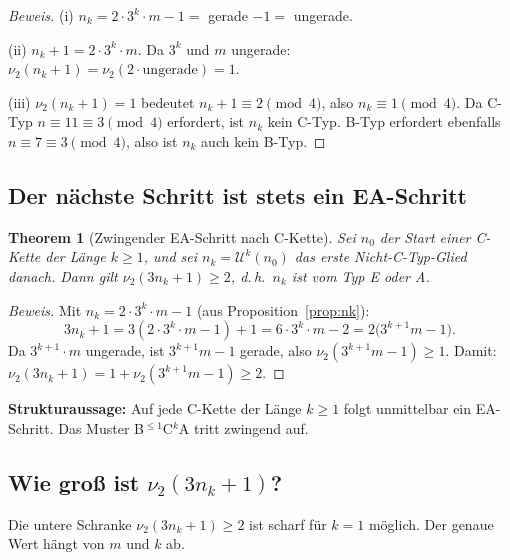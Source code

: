 \documentclass[12pt,a4paper]{article}
\newtheorem{theorem}[definition]{Theorem}
\newenvironment{beweis}{\begin{proof}[Beweis]}{\end{proof}}
\newcommand{\vii}{\nu_2}
\newcommand{\U}{\mathcal{U}}
\begin{document}
\begin{beweis}
(i) $n_k = 2 \cdot 3^k \cdot m - 1 =$ gerade $-1 =$ ungerade. \checkmark

(ii) $n_k + 1 = 2 \cdot 3^k \cdot m$. Da $3^k$ und $m$ ungerade:
$\vii(n_k+1) = \vii(2 \cdot \text{ungerade}) = 1$. \checkmark

(iii) $\vii(n_k+1) = 1$ bedeutet $n_k + 1 \equiv 2 \pmod 4$, also
$n_k \equiv 1 \pmod 4$. Da C-Typ $n \equiv 11 \equiv 3 \pmod 4$ erfordert,
ist $n_k$ kein C-Typ. B-Typ erfordert ebenfalls $n \equiv 7 \equiv 3 \pmod 4$,
also ist $n_k$ auch kein B-Typ. \qedhere
\end{beweis}

\subsection{Der nächste Schritt ist stets ein EA-Schritt}

\begin{theorem}[Zwingender EA-Schritt nach C-Kette]
\label{thm:ea-nach-ck}
Sei $n_0$ der Start einer C-Kette der Länge $k \geq 1$, und sei
$n_k = \U^k(n_0)$ das erste Nicht-C-Typ-Glied danach.
Dann gilt $\vii(3n_k+1) \geq 2$, d.\,h.\ $n_k$ ist vom Typ E oder A.
\end{theorem}

\begin{beweis}
Mit $n_k = 2 \cdot 3^k \cdot m - 1$ (aus Proposition~\ref{prop:nk}):
\[
  3n_k + 1 = 3(2 \cdot 3^k \cdot m - 1) + 1 = 6 \cdot 3^k \cdot m - 2
           = 2\bigl(3^{k+1} m - 1\bigr).
\]
Da $3^{k+1} \cdot m$ ungerade, ist $3^{k+1} m - 1$ gerade, also
$\vii(3^{k+1}m - 1) \geq 1$.
Damit: $\vii(3n_k+1) = 1 + \vii(3^{k+1}m-1) \geq 2$. \qedhere
\end{beweis}

\begin{tcolorbox}[ergebnis]
\textbf{Strukturaussage:} Auf jede C-Kette der Länge $k \geq 1$ folgt
unmittelbar ein EA-Schritt. Das Muster \textnormal{B}$^{\leq 1}$\textnormal{C}$^k$\textnormal{A}
tritt zwingend auf.
\end{tcolorbox}

\subsection{Wie groß ist $\nu_2(3n_k+1)$?}

Die untere Schranke $\vii(3n_k+1) \geq 2$ ist scharf für $k=1$ möglich.
Der genaue Wert hängt von $m$ und $k$ ab.
\end{document}
